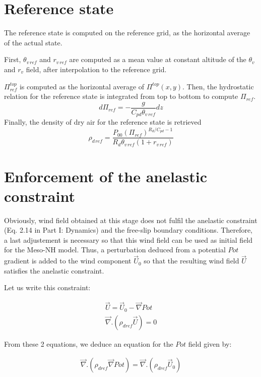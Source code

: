 \section{Reference state}

The reference state is computed on the reference grid, as the horizontal
average of the actual state.

First, $\theta_{v\,ref}$ and $r_{v\,ref}$ are computed as a mean value at
constant altitude of the $\theta_v$ and $r_v$ field, after interpolation
to the reference grid.

$\Pi_{ref}^{top}$ is computed as the horizontal average of $\Pi^{top}(x,y)$.
Then, the hydrostatic relation for the reference state
is integrated from top to bottom to compute $\Pi_{ref}$.
\begin{equation}
d\Pi_{ref}=-\frac{g}{C_{pd}\theta_{v\,ref}}dz
\end{equation}
Finally, the density of dry air for the reference state is retrieved
\begin{equation}
\rho_{d\,ref}=\frac{P_{00}(\Pi_{ref})^{R_d/C_{pd}-1}}
{R_d \theta_{v\,ref}(1+r_{v\,ref})}
\end{equation}

\section{Enforcement of the anelastic constraint}

Obviously, wind field obtained at this stage does not fulfil the anelastic constraint
(Eq. 2.14 in Part I: Dynamics)
and the free-slip boundary conditions. Therefore, a
last adjustement is necessary so that this wind field can be used as initial
field for the Meso-NH model. Thus, a perturbation deduced from a potential $Pot$
gradient is added to the wind component $\vec{U}_0$ so that the resulting
 wind field $\vec{U}$ satisfies the anelastic constraint.

Let us write this constraint:

\begin{eqnarray}
\vec{U} = \vec{U} _0 - \vec {\nabla } Pot  \nonumber \\
\vec { \nabla } . \left( \rho _{dref}  \vec{U}  \right) = 0 \nonumber
\end{eqnarray}

From these 2 equations, we deduce an equation for the $Pot$ field given by:

\begin{eqnarray}
\vec { \nabla } .  \left( \rho _{dref} \vec {\nabla } Pot \right) = \vec { \nabla } .
 \left( \rho _{dref}  \vec{U} _0 \right) \label{eq:potential}
\end{eqnarray}

